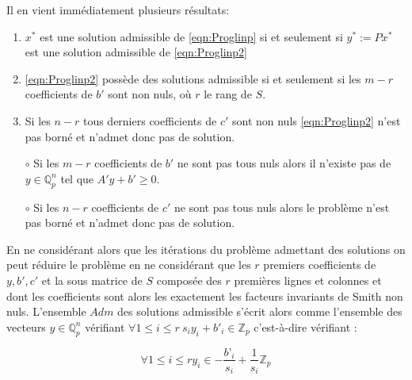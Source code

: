 \begin{definition}
\begin{remarques}
	
Il en vient immédiatement plusieurs résultats:
\begin{enumerate}
	\item $x^*$ est une solution admissible de \ref{eqn:Proglinp} si et seulement si $y^* := P x^*$ est une solution admissible de \ref{eqn:Proglinp2}
	\item \ref{eqn:Proglinp2} possède des solutions admissible si et seulement si les $m-r$ coefficients de $b'$ sont non nuls, où $r$ le rang de $S$.     
	\item Si les $n-r$ tous derniers coefficients de $c'$ sont non nuls \ref{eqn:Proglinp2} n'est pas borné et n'admet donc pas de solution.   
\end{enumerate}

\end{remarques}

\begin{propriete}
	\begin{itemize}~

		\item[$\circ$] Si les $m-r$ coefficients de $b'$ ne sont pas tous nuls alors il n'existe pas de $y \in \mathbb{Q}_{p} ^n$ tel que $A'y+b' \ge  0$.
	\item[$\circ$] Si les $n-r$ coefficients de $c'$ ne sont pas tous nuls alors le problème n'est pas borné et n'admet donc pas de solution. \end{itemize} 
\end{propriete}
En ne considérant alors que les itérations du problème admettant des solutions on peut réduire le problème en ne considérant que les $r$ premiers coefficients de $y, b', c'$ et la sous matrice de $S$ composée des $r$ premières lignes et colonnes et dont les coefficients sont alors les exactement les facteurs invariants de Smith non nuls. L'ensemble $Adm$ des solutions admissible s'écrit alors comme l'ensemble des vecteurs $y \in \mathbb{Q}_{ p } ^n$ vérifiant $
\forall 1 \le i\le r \ s_i y_i + b'_i \in \mathbb{Z}_p$ c'est-à-dire vérifiant :

\begin{equation}
	\forall 1 \le i\le r  y_i \in -\frac{b’_i}{s_i} + \frac{1}{s_i} \mathbb{Z}_p
\end{equation}
 


\end{definition}
